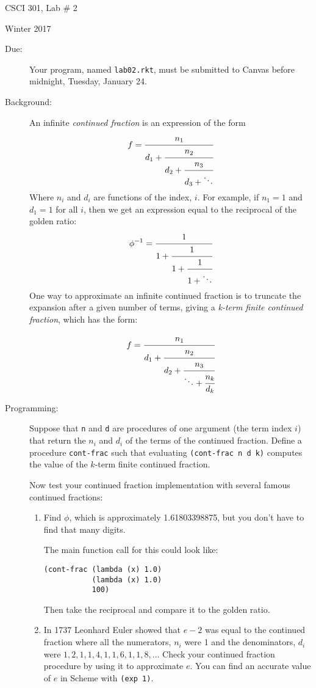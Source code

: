 \documentclass{article}
\begin{document}
\centerline{\Large CSCI 301, Lab \# 2}
\centerline{\large Winter 2017}
\begin{multicols}{2}

\begin{description}
\item[Due:] Your program, named {\tt lab02.rkt}, must be submitted to
  Canvas before midnight, Tuesday, January 24.

\item[Background:] An infinite {\em continued fraction} is an expression
of the form
\[
f = \cfrac{n_1}{d_1 + \cfrac{n_2}{d_2 + \cfrac{n_3}{d_3 + \ddots}}}
\]
Where $n_i$ and $d_i$ are functions of the index, $i$.
For example, if $n_1=1$ and $d_1=1$ for all $i$, then we get an
expression equal to the reciprocal of the golden ratio:
\[
{\phi^{-1}} = \cfrac{1}{1 + \cfrac{1}{1 + \cfrac{1}{1 + \ddots}}}
\]
One way to approximate an infinite continued fraction is to truncate
the expansion after a given number of terms, giving a 
{\em k-term finite continued fraction}, which has the form:

\[
f = \cfrac{n_1}{d_1 + \cfrac{n_2}{d_2 + \cfrac{n_3}{\ddots + \cfrac{n_k}{d_k}}}}
\]


\item[Programming:]\mbox{}


Suppose that {\tt n} and {\tt d} are procedures of one argument 
(the term index $i$) that return the $n_i$ and $d_i$ of the terms of
the continued fraction.  Define a procedure {\tt cont-frac} such that
evaluating {\tt (cont-frac n d k)} computes the value of the $k$-term
finite continued fraction.

Now test your continued fraction implementation with several
  famous continued fractions:
\begin{enumerate}
\item Find $\phi$, which is approximately 1.61803398875, but you don't
  have to find that many digits.

 The main function call for this could look like:
  \begin{verbatim}
(cont-frac (lambda (x) 1.0)
           (lambda (x) 1.0)
           100)
\end{verbatim}
  Then take the reciprocal and compare it to the golden ratio.

\item
In 1737 Leonhard Euler showed that $e-2$
was equal to the continued fraction where all the numerators, $n_i$ were 1
and the denominators, $d_i$ were $1,2,1,1,4,1,1,6,1,1,8,\ldots$
Check your continued fraction procedure by using it to approximate $e$.  
You can find an accurate value of $e$ in
Scheme with {\tt (exp 1)}.


\end{enumerate}
\end{description}
\end{multicols}
\end{document}
